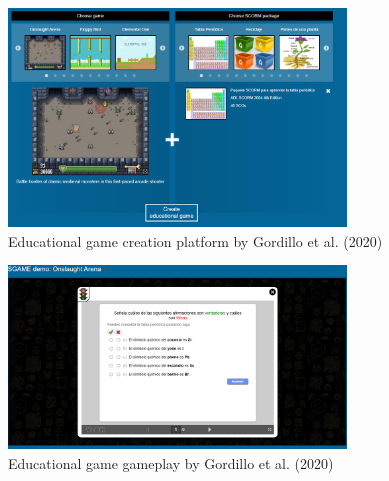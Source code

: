 \begin{figure}
    \centering
    \includegraphics[width=0.8\textwidth]{figures/Related_Work/Sgame_creation.png}
    \caption{Educational game creation platform by Gordillo et al. (2020) \cite{sgame2020}}
    \label{fig:sgame2020_creation}
\end{figure}

\begin{figure}
    \centering
    \includegraphics[width=0.8\textwidth]{figures/Related_Work/Sgame_gameplay.png}
    \caption{Educational game gameplay by Gordillo et al. (2020) \cite{sgame2020}}
    \label{fig:sgame2020_gameplay}
\end{figure}